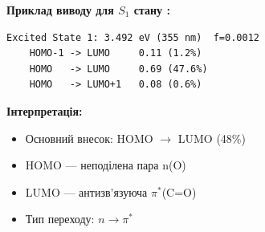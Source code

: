 
\textbf{Приклад виводу для $S_1$ стану :}
\begin{verbatim}
Excited State 1: 3.492 eV (355 nm)  f=0.0012
    HOMO-1 -> LUMO     0.11 (1.2%)
    HOMO   -> LUMO     0.69 (47.6%)
    HOMO   -> LUMO+1   0.08 (0.6%)
\end{verbatim}

\textbf{Інтерпретація:}
\begin{itemize}
    \item Основний внесок: HOMO $\to$ LUMO (48\%)
    \item HOMO --- неподілена пара n(O)
    \item LUMO --- антизв'язуюча $\pi^*$(C=O)
    \item Тип переходу: $n\to\pi^*$
\end{itemize}